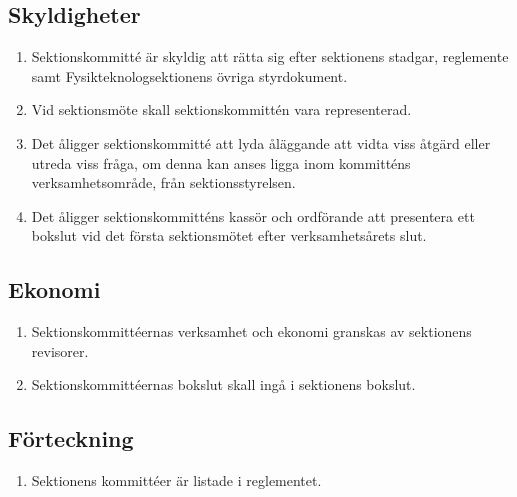 \documentclass[11pt,a4paper]{article}
\begin{document}
\subsection{Skyldigheter}

\begin{enumerate}[\thesubsection.1]


  \item Sektionskommitté är skyldig att rätta sig efter sektionens stadgar,  reglemente samt Fysikteknologsektionens övriga styrdokument.
  
  \item Vid sektionsmöte skall sektionskommittén vara representerad.

  \item Det åligger sektionskommitté att lyda åläggande att vidta viss
  åtgärd eller utreda viss fråga, om denna kan anses ligga inom
  kommitténs verksamhetsområde, från sektionsstyrelsen.

  \item Det åligger sektionskommitténs kassör och ordförande att
  presentera ett bokslut vid det första sektionsmötet efter verksamhetsårets slut.

\end{enumerate}

\subsection{Ekonomi}

\begin{enumerate}[\thesubsection.1]

  \item Sektionskommittéernas verksamhet och ekonomi granskas av
  sektionens revisorer.

  \item Sektionskommittéernas bokslut skall ingå i sektionens bokslut.

\end{enumerate}

\subsection{Förteckning}

\begin{enumerate}[\thesubsection.1]

  \item Sektionens kommittéer är listade i reglementet.

\end{enumerate}
\end{document}
